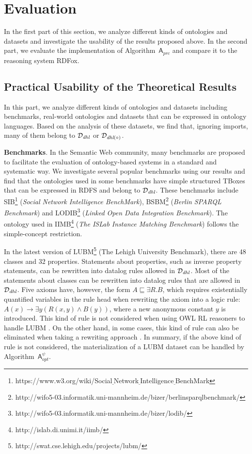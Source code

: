 \documentclass[final,1p,times]{elsarticle}
\begin{document}
\section{Evaluation}
\label{sec:evaluation}

In the first part of this section, we analyze different kinds of ontologies and datasets
and investigate the usability of the results proposed above.
In the second part, we evaluate the implementation of Algorithm~$\mathsf{A}_{prc}$
and compare it to the reasoning system RDFox.

\subsection{Practical Usability of the Theoretical Results}

In this part, we analyze different kinds of ontologies and datasets
including benchmarks, real-world ontologies and
datasets that can be expressed in ontology languages.
Based on the analysis of these datasets,
we find that, ignoring imports, many of them
belong to $\mathcal{D}_{\textit{\text{dhl}}}$ or
$\mathcal{D}_{\textit{\text{dhl}}(\circ)}$.

\textbf{Benchmarks}. In the
Semantic Web community, many benchmarks are proposed to
facilitate the evaluation of ontology-based systems
in a standard and systematic way. We investigate several
popular benchmarks using our results and find that
the ontologies used in some benchmarks have simple
structured TBoxes that can be expressed in RDFS
and belong to $\mathcal{D}_{\textit{\text{dhl}}}$.
These benchmarks include SIB\footnote{https://www.w3.org/wiki/Social$\underline{~}$Network$\underline{~}$Intelligence$\underline{~}$BenchMark}
(\emph{Social Network Intelligence BenchMark}),
BSBM\footnote{http://wifo5-03.informatik.uni-mannheim.de/bizer/berlinsparqlbenchmark/}
(\emph{Berlin SPARQL Benchmark}) and
LODIB\footnote{http://wifo5-03.informatik.uni-mannheim.de/bizer/lodib/}
(\emph{Linked Open Data Integration Benchmark}).
The ontology used in IIMB\footnote{http://islab.di.unimi.it/iimb/}
(\emph{The ISLab Instance Matching Benchmark}) follows the simple-concept restriction.

In the latest version of LUBM\footnote{http://swat.cse.lehigh.edu/projects/lubm/}
(The Lehigh University Benchmark),
there are 48 classes and 32 properties.
Statements about properties, such as inverse property statements,
can be rewritten into datalog rules allowed in $\mathcal{D}_{\textit{\text{dhl}}}$.
Most of the statements about classes can be rewritten into datalog rules that
are allowed in $\mathcal{D}_{\textit{\text{dhl}}}$.
Five axioms have, however, the form $A\sqsubseteq\exists R.B$,
which requires existentially quantified variables in the rule head when rewriting
the axiom into a logic rule: $A(x)\rightarrow\exists y(R(x,y)\wedge B(y))$,
where a new anonymous constant $y$ is introduced.
This kind of rule is not considered when using OWL RL reasoners to handle LUBM \cite{UrbaniKMHB12,WeaverH09}.
On the other hand, in some cases, this kind of rule can also be
eliminated when taking a rewriting approach \cite{GrauHKKMMW13}.
In summary, if the above kind of rule is not considered,
the materialization of a LUBM dataset can be handled by Algorithm~$\mathsf{A}_{opt}^{\psi}$.
\end{document}
